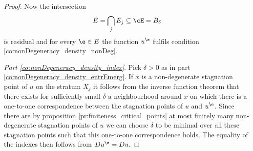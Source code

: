 \begin{proof}
  Now the intersection
  \begin{align*}
    E=\bigcap_j E_j\subseteq \cE =B_\delta
  \end{align*}
  is residual and
  for every $\e\in E$ the function $u^\e$ fulfils condition
  \ref{co:nonDegeneracy_density_nonDeg}.

  \emph{Part \ref{co:nonDegeneracy_density_index}}.
  Pick $\delta>0$ as in part \ref{co:nonDegeneracy_density_entrEmerg}.
  If $x$ is a non-degenerate stagnation point of $u$ on the stratum $X_j$ it follows 
  from the inverse function theorem that there exists for sufficiently small $\delta$
  a neighbourhood around $x$ on which there is a one-to-one correspondence between the
  stagnation points of $u$ and $u^\e$.
  Since there are by proposition \ref{pr:finiteness_critical_points} at most finitely many non-degenerate stagnation points of
  $u$ we can choose $\delta$ to be minimal over all these stagnation points such that this one-to-one correspondence holds.
  The equality of the indexes then follows from $Du^\e=Du$.
\end{proof}



